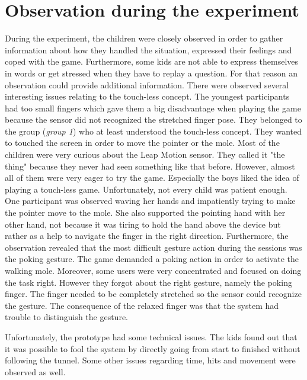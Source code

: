 \section{Observation during the experiment}
During the experiment, the children were closely observed in order to gather information about how they handled the situation, expressed their feelings and coped with the game. Furthermore, some kids are not able to express themselves in words or get stressed when they have to replay a question. For that reason an observation could provide additional information.
There were observed several interesting issues relating to the touch-less concept. The youngest participants had too small fingers which gave them a big disadvantage when playing the game because the sensor did not recognized the stretched finger pose. They belonged to the group (\textit{group 1}) who at least understood the touch-less concept. They wanted to touched the screen in order to move the pointer or the mole. 
Most of the children were very curious about the Leap Motion sensor. They called it "the thing" because they never had seen something like that before. However, almost all of them were very eager to try the game. Especially the boys liked the idea of playing a touch-less game.
Unfortunately, not every child was patient enough. One participant was observed waving her hands and impatiently trying to make the pointer move to the mole. She also supported the pointing hand with her other hand, not because it was tiring to hold the hand above the device but rather as a help to navigate the finger in the right direction.  
Furthermore, the observation revealed that the most difficult gesture action during the sessions was the poking gesture. The game demanded a poking action in order to activate the walking mole.
Moreover, some users were very concentrated and focused on doing the task right. However they forgot about the right gesture, namely the poking finger. The finger needed to be completely stretched so the sensor could recognize the gesture. The consequence of the relaxed finger was that the system had trouble to distinguish the gesture.

Unfortunately, the prototype had some technical issues. The kids found out that it was possible to fool the system by directly going from start to finished without following the tunnel. Some other issues regarding time, hits and movement were observed as well. 



